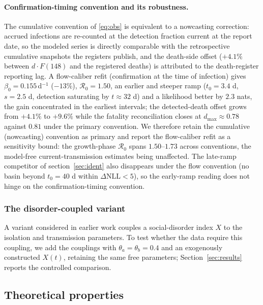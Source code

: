 \documentclass[preprint,12pt,numbers]{elsarticle}
\newcommand{\Reff}{\mathcal{R}}
\begin{document}
\paragraph{Confirmation-timing convention and its robustness.}
The cumulative convention of \eqref{eq:obs} is equivalent to a nowcasting
correction: accrued infections are re-counted at the detection fraction
current at the report date, so the modeled series is directly comparable
with the retrospective cumulative snapshots the registers publish, and
the death-side offset ($+4.1\%$ between $d\cdot F(148)$ and the
registered deaths) is attributed to the death-register reporting lag.
A flow-caliber refit (confirmation at the time of infection) gives
$\beta_0=0.155\,$d$^{-1}$ ($-13\%$), $\Reff_0=1.50$, an earlier and
steeper ramp ($t_0=3.4$ d, $s=2.5$ d, detection saturating by
$t\approx32$ d) and a likelihood better by $2.3$ nats, the gain
concentrated in the earliest intervals; the detected-death offset grows
from $+4.1\%$ to $+9.6\%$ while the fatality reconciliation closes at
$d_{\max}\approx0.78$ against $0.81$ under the primary convention. We
therefore retain the cumulative (nowcasting) convention as primary and
report the flow-caliber refit as a sensitivity bound: the growth-phase
$\Reff_0$ spans $1.50$--$1.73$ across conventions, the model-free
current-transmission estimates being unaffected. The late-ramp
competitor of section~\ref{sec:ident} also disappears under the flow
convention (no basin beyond $t_0=40$ d within
$\Delta\mathrm{NLL}<5$), so the early-ramp reading does not hinge on
the confirmation-timing convention.
\subsubsection{The disorder-coupled variant}\label{sec:variant}

A variant considered in earlier work couples a social-disorder index $X$
to the isolation and transmission parameters. To test whether the data
require this coupling, we add the couplings with $\theta_a=\theta_b=0.4$
and an exogenously constructed $X(t)$, retaining the same free
parameters; Section~\ref{sec:results} reports the controlled comparison.

\subsection{Theoretical properties}\label{sec:theory}
\end{document}
